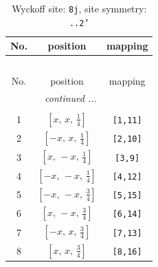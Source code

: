 \documentclass[fleqn,8pt]{jsarticle}
\begin{document}
\begin{longtable}{ccc}
\caption{Wyckoff site: {\tt 8j}, site symmetry: {\tt ..2'}}
 \\
 \hline \hline
No. & position & mapping \\ \hline \endfirsthead

\multicolumn{2}{l}{\tablename\ \thetable{}} \\
 \hline \hline
No. & position & mapping \\ \hline \endhead

 \hline \hline
\multicolumn{2}{r}{\footnotesize\it continued ...} \\ \endfoot

 \hline \hline
\multicolumn{2}{r}{} \\ \endlastfoot

1 & $\left[ x,\, x,\, \frac{1}{4} \right]$ & {\tt [1,11]} \\ \hline
2 & $\left[ - x,\, x,\, \frac{1}{4} \right]$ & {\tt [2,10]} \\ \hline
3 & $\left[ x,\, - x,\, \frac{1}{4} \right]$ & {\tt [3,9]} \\ \hline
4 & $\left[ - x,\, - x,\, \frac{1}{4} \right]$ & {\tt [4,12]} \\ \hline
5 & $\left[ - x,\, - x,\, \frac{3}{4} \right]$ & {\tt [5,15]} \\ \hline
6 & $\left[ x,\, - x,\, \frac{3}{4} \right]$ & {\tt [6,14]} \\ \hline
7 & $\left[ - x,\, x,\, \frac{3}{4} \right]$ & {\tt [7,13]} \\ \hline
8 & $\left[ x,\, x,\, \frac{3}{4} \right]$ & {\tt [8,16]} \\
\end{longtable}
\renewcommand{\arraystretch}{1.2}
\end{document}
